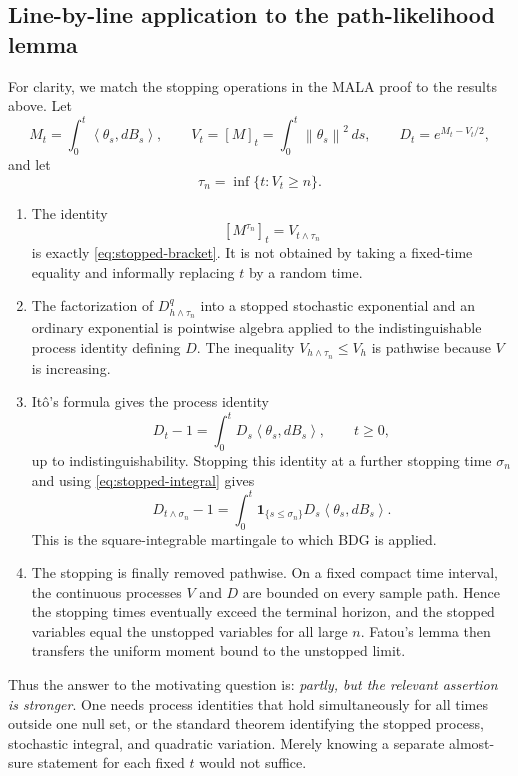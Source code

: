\documentclass[11pt]{article}
\newcommand{\ip}[2]{\left\langle #1,#2\right\rangle}
\newcommand{\norm}[1]{\left\lVert #1\right\rVert}
\newcommand{\1}{\mathbf 1}
\begin{document}
\subsection{Line-by-line application to the path-likelihood lemma}

For clarity, we match the stopping operations in the MALA proof to the
results above.  Let
\[
 M_t=\int_0^t\ip{\theta_s}{dB_s},
 \qquad
 V_t=[M]_t=\int_0^t\norm{\theta_s}^2\,ds,
 \qquad
 D_t=e^{M_t-V_t/2},
\]
and let
\[
 \tau_n=\inf\{t:V_t\geq n\}.
\]

\begin{enumerate}[label=\textnormal{(\roman*)},leftmargin=2.7em]
\item The identity
\[
 [M^{\tau_n}]_t=V_{t\wedge\tau_n}
\]
is exactly \eqref{eq:stopped-bracket}.  It is not obtained by taking a
fixed-time equality and informally replacing \(t\) by a random time.

\item The factorization of \(D_{h\wedge\tau_n}^q\) into a stopped
stochastic exponential and an ordinary exponential is pointwise algebra
applied to the indistinguishable process identity defining \(D\).  The
inequality
\(V_{h\wedge\tau_n}\leq V_h\) is pathwise because \(V\) is increasing.

\item It\^o's formula gives the process identity
\[
 D_t-1=\int_0^tD_s\ip{\theta_s}{dB_s},
 \qquad t\geq0,
\]
up to indistinguishability.  Stopping this identity at a further stopping
time \(\sigma_n\) and using \eqref{eq:stopped-integral} gives
\[
 D_{t\wedge\sigma_n}-1
 =\int_0^t\1_{\{s\leq\sigma_n\}}
 D_s\ip{\theta_s}{dB_s}.
\]
This is the square-integrable martingale to which BDG is applied.

\item The stopping is finally removed pathwise.  On a fixed compact time
interval, the continuous processes \(V\) and \(D\) are bounded on every
sample path.  Hence the stopping times eventually exceed the terminal
horizon, and the stopped variables equal the unstopped variables for all
large \(n\).  Fatou's lemma then transfers the uniform moment bound to the
unstopped limit.
\end{enumerate}

Thus the answer to the motivating question is: \emph{partly, but the
relevant assertion is stronger}.  One needs process identities that hold
simultaneously for all times outside one null set, or the standard theorem
identifying the stopped process, stochastic integral, and quadratic
variation.  Merely knowing a separate almost-sure statement for each fixed
\(t\) would not suffice.
\end{document}
